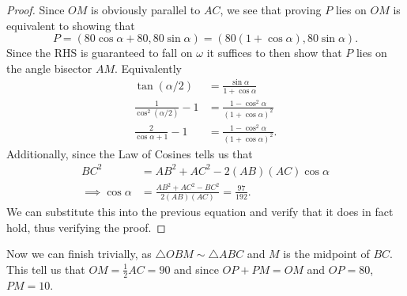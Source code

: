 \documentclass[a4paper, 12pt]{article}
\begin{document}
\begin{solution}
\begin{proof}
        Since \( OM \) is obviously parallel to \( AC \), we see that proving \( P \) lies on \( OM \) is equivalent to showing that
        \[
            P = (80 \cos\alpha + 80, 80 \sin\alpha) = (80 (1 + \cos\alpha), 80 \sin\alpha)
        .\]
        Since the RHS is guaranteed to fall on \( \omega \) it suffices to then show that \( P \) lies on the angle bisector \( AM \). Equivalently
        \begin{align*}
            \tan(\alpha / 2) &= \frac{\sin \alpha}{1 + \cos \alpha} \\
            \frac{1}{\cos^2 (\alpha / 2)} - 1 &= \frac{1 - \cos^2 \alpha}{(1 + \cos \alpha)^2} \\
            \frac{2}{\cos \alpha + 1} -1 &= \frac{1 - \cos^2 \alpha}{(1 + \cos \alpha)^2}
        .\end{align*}
        Additionally, since the Law of Cosines tells us that
        \begin{align*}
            BC^2 &= AB^2 + AC^2 - 2(AB)(AC) \cos \alpha \\
            \implies \cos \alpha &= \frac{AB^2 + AC^2 - BC^2}{2(AB)(AC)} = \frac{97}{192}
        .\end{align*}
        We can substitute this into the previous equation and verify that it does in fact hold, thus verifying the proof.
    \end{proof}

    Now we can finish trivially, as \( \triangle OBM \sim \triangle ABC \) and \( M \) is the midpoint of \( BC \). This tell us that \( OM = \frac{1}{2} AC = 90 \) and since \( OP + PM = OM \) and \( OP = 80 \), \( PM = \boxed{10} \).
\end{solution}
\end{document}
